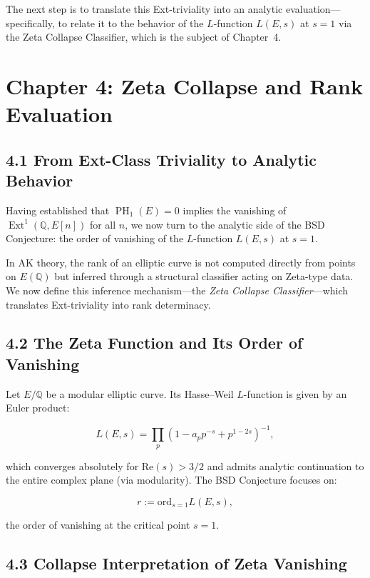 \documentclass[11pt]{article}
\DeclareMathOperator{\Ext}{Ext}
\DeclareMathOperator{\PH}{PH}
\newcommand{\QQ}{\mathbb{Q}}
\begin{document}
The next step is to translate this Ext-triviality into an analytic evaluation—specifically, to relate it to the behavior of the $L$-function $L(E,s)$ at $s=1$ via the Zeta Collapse Classifier, which is the subject of Chapter~4.




\section{Chapter 4: Zeta Collapse and Rank Evaluation}

\subsection{4.1 From Ext-Class Triviality to Analytic Behavior}

Having established that $\PH_1(E) = 0$ implies the vanishing of $\Ext^1(\QQ,E[n])$ for all $n$, we now turn to the analytic side of the BSD Conjecture:  
the order of vanishing of the $L$-function $L(E,s)$ at $s = 1$.

In AK theory, the rank of an elliptic curve is not computed directly from points on $E(\QQ)$ but inferred through a structural classifier acting on Zeta-type data.  
We now define this inference mechanism—the \emph{Zeta Collapse Classifier}—which translates Ext-triviality into rank determinacy.

\subsection{4.2 The Zeta Function and Its Order of Vanishing}

Let $E/\QQ$ be a modular elliptic curve.  
Its Hasse–Weil $L$-function is given by an Euler product:

\[
L(E,s) = \prod_p \left(1 - a_p p^{-s} + p^{1 - 2s}\right)^{-1},
\]

which converges absolutely for $\mathrm{Re}(s) > 3/2$ and admits analytic continuation to the entire complex plane (via modularity).  
The BSD Conjecture focuses on:

\[
r := \mathrm{ord}_{s=1} L(E,s),
\]

the order of vanishing at the critical point $s = 1$.

\subsection{4.3 Collapse Interpretation of Zeta Vanishing}
\end{document}
